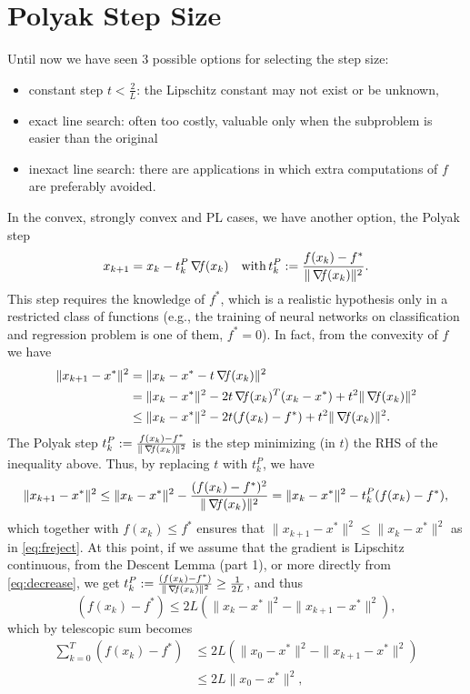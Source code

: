 \documentclass[10pt,a4paper]{article}
\begin{document}
\section{Polyak Step Size}
Until now we have seen 3 possible options for selecting the step size:
\begin{itemize}
	\item constant step $t<\frac{2}{L}$: the Lipschitz constant may not exist or be unknown,
	\item exact line search: often too costly, valuable only when the subproblem is easier than the original
	\item inexact line search: there are applications in which extra computations of $f$ are preferably avoided.
\end{itemize}
In the convex, strongly convex and PL cases, we have another option, the Polyak step
\begin{equation}\label{eq:polyak}
	x_{k+1} = x_k - t_k^P \operatorname*{\mathit{\nabla \!f}}(x_k) \quad\mathord{\mathrm{with }}\, t_k^P:= \frac{f(x_k)-f^*}{\|\operatorname*{\mathit{\nabla \!f}}(x_k)\|^2}.
\end{equation}
This step requires the knowledge of $f^*$, which is a realistic hypothesis only in a restricted class of functions (e.g., the training of neural networks on classification and regression problem is one of them, $f^*=0$). In fact, from the convexity of $f$ we have
\begin{align*}
	\|x_{k+1} - x^*\|^2 &= \|x_k - x^* - t\operatorname*{\mathit{\nabla \!f}}(x_k)\|^2\\
	&= \|x_k - x^*\|^2 - 2t \operatorname*{\mathit{\nabla \!f}}(x_k)^T (x_k - x^*) + t^2\|\operatorname*{\mathit{\nabla \!f}}(x_k)\|^2\\
	&\leq \|x_k - x^*\|^2 - 2t(f(x_k) - f^*) + t^2\|\operatorname*{\mathit{\nabla \!f}}(x_k)\|^2.\\
\end{align*}
The Polyak step $t_k^P:= \frac{f(x_k)-f^*}{\|\operatorname*{\mathit{\nabla \!f}}(x_k)\|^2}$ is the step minimizing (in $t$) the RHS of the inequality above. Thus, by replacing $t$ with $t_k^P$, we have
$$\|x_{k+1} - x^*\|^2 \leq  \|x_k - x^*\|^2 - \frac{(f(x_k) - f^*)^2}{\|\operatorname*{\mathit{\nabla \!f}}(x_k)\|^2} = \|x_k - x^*\|^2 - t_k^P(f(x_k) - f^*),$$
which together with $f(x_k) \leq f^*$ ensures that $\|x_{k+1} - x^*\|^2 \leq  \|x_k - x^*\|^2 $ as in \eqref{eq:freject}. At this point, if we assume that the gradient is Lipschitz continuous, from the Descent Lemma (part 1), or more directly from \eqref{eq:decrease}, we get $t_k^P:=\frac{(f(x_k) - f^*)}{\|\operatorname*{\mathit{\nabla \!f}}(x_k)\|^2}\geq \frac{1}{2L}$, and thus
$$ (f(x_k) - f^*)\leq 2L \left(\|x_k-x^*\|^2-\|x_{k+1}-x^*\|^2\right),$$
which by telescopic sum becomes  
\begin{align*}
	\sum_{k=0}^T(f(x_k) - f^*) &\leq 2L \left(\|x_0-x^*\|^2-\|x_{k+1}-x^*\|^2\right)\\
	&\leq 2L \|x_0-x^*\|^2,
\end{align*} 
\end{document}
